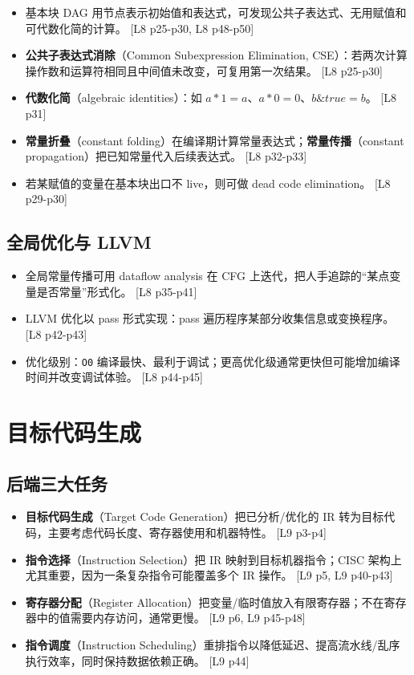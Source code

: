 \documentclass[UTF8,fontset=none,11pt]{ctexart}
\newcommand{\pg}[1]{{\scriptsize\textcolor{citegray}{[#1]}}}
\newcommand{\term}[2]{\textbf{#1}（#2）}
\newcommand{\code}[1]{\texttt{#1}}
\begin{document}
\begin{itemize}
  \item 基本块 DAG 用节点表示初始值和表达式，可发现公共子表达式、无用赋值和可代数化简的计算。 \pg{L8 p25-p30, L8 p48-p50}
  \item \term{公共子表达式消除}{Common Subexpression Elimination, CSE}：若两次计算操作数和运算符相同且中间值未改变，可复用第一次结果。 \pg{L8 p25-p30}
  \item \term{代数化简}{algebraic identities}：如 \(a*1=a\)、\(a*0=0\)、\(b\&true=b\)。 \pg{L8 p31}
  \item \term{常量折叠}{constant folding}在编译期计算常量表达式；\term{常量传播}{constant propagation}把已知常量代入后续表达式。 \pg{L8 p32-p33}
  \item 若某赋值的变量在基本块出口不 live，则可做 dead code elimination。 \pg{L8 p29-p30}
\end{itemize}

\subsection{全局优化与 LLVM}

\begin{itemize}
  \item 全局常量传播可用 dataflow analysis 在 CFG 上迭代，把人手追踪的“某点变量是否常量”形式化。 \pg{L8 p35-p41}
  \item LLVM 优化以 pass 形式实现：pass 遍历程序某部分收集信息或变换程序。 \pg{L8 p42-p43}
  \item 优化级别：\code{O0} 编译最快、最利于调试；更高优化级通常更快但可能增加编译时间并改变调试体验。 \pg{L8 p44-p45}
\end{itemize}

\section{目标代码生成}

\subsection{后端三大任务}

\begin{itemize}
  \item \term{目标代码生成}{Target Code Generation}把已分析/优化的 IR 转为目标代码，主要考虑代码长度、寄存器使用和机器特性。 \pg{L9 p3-p4}
  \item \term{指令选择}{Instruction Selection}把 IR 映射到目标机器指令；CISC 架构上尤其重要，因为一条复杂指令可能覆盖多个 IR 操作。 \pg{L9 p5, L9 p40-p43}
  \item \term{寄存器分配}{Register Allocation}把变量/临时值放入有限寄存器；不在寄存器中的值需要内存访问，通常更慢。 \pg{L9 p6, L9 p45-p48}
  \item \term{指令调度}{Instruction Scheduling}重排指令以降低延迟、提高流水线/乱序执行效率，同时保持数据依赖正确。 \pg{L9 p44}
\end{itemize}
\end{document}
